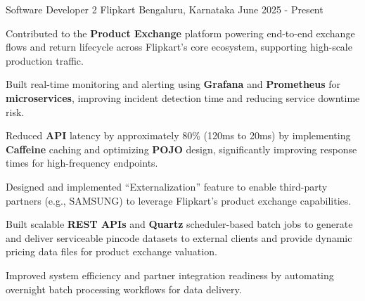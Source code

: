 

\begin{cventries}

  \cventry
    {Software Developer 2} %
    {Flipkart} %
    {Bengaluru, Karnataka} %
    {June 2025 - Present} %
    {
      \begin{cvitems} %
        \item {Contributed to the \textbf{Product Exchange} platform powering end-to-end exchange flows and return lifecycle across Flipkart's core ecosystem, supporting high-scale production traffic.}
        \item {Built real-time monitoring and alerting using \textbf{Grafana} and \textbf{Prometheus} for \textbf{microservices}, improving incident detection time and reducing service downtime risk.}
        \item {Reduced \textbf{API} latency by approximately 80\% (120ms to 20ms) by implementing \textbf{Caffeine} caching and optimizing \textbf{POJO} design, significantly improving response times for high-frequency endpoints.}
        \item {Designed and implemented ``Externalization'' feature to enable third-party partners (e.g., SAMSUNG) to leverage Flipkart's product exchange capabilities.}
        \item {Built scalable \textbf{REST APIs} and \textbf{Quartz} scheduler-based batch jobs to generate and deliver serviceable pincode datasets to external clients and provide dynamic pricing data files for product exchange valuation.}
        \item {Improved system efficiency and partner integration readiness by automating overnight batch processing workflows for data delivery.}
      \end{cvitems}
    }


\end{cventries}

